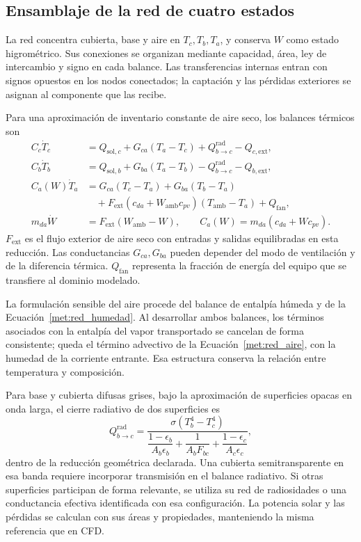 \subsection{Ensamblaje de la red de cuatro estados}
\label{met:red}

La red concentra cubierta, base y aire en $T_c,T_b,T_a$, y conserva $W$ como estado higrométrico. Sus conexiones se organizan mediante capacidad, área, ley de intercambio y signo en cada balance. Las transferencias internas entran con signos opuestos en los nodos conectados; la captación y las pérdidas exteriores se asignan al componente que las recibe.

Para una aproximación de inventario constante de aire seco, los balances térmicos son
\begin{align}
C_c\dot T_c&=Q_{\mathrm{sol},c}+G_{ca}(T_a-T_c)+Q_{b\to c}^{\mathrm{rad}}-Q_{c,\mathrm{ext}},
\label{met:red_cubierta}\\
C_b\dot T_b&=Q_{\mathrm{sol},b}+G_{ba}(T_a-T_b)-Q_{b\to c}^{\mathrm{rad}}-Q_{b,\mathrm{ext}},
\label{met:red_base}\\
C_a(W)\dot T_a&=G_{ca}(T_c-T_a)+G_{ba}(T_b-T_a)
\nonumber\\[-1mm]
&\quad+F_{\mathrm{ext}}(c_{da}+W_{\mathrm{amb}}c_{pv})(T_{\mathrm{amb}}-T_a)+Q_{\mathrm{fan}},
\label{met:red_aire}\\
m_{da}\dot W&=F_{\mathrm{ext}}(W_{\mathrm{amb}}-W),\qquad
C_a(W)=m_{da}(c_{da}+Wc_{pv}).
\label{met:red_humedad}
\end{align}
$F_{\mathrm{ext}}$ es el flujo exterior de aire seco con entradas y salidas equilibradas en esta reducción. Las conductancias $G_{ca},G_{ba}$ pueden depender del modo de ventilación y de la diferencia térmica. $Q_{\mathrm{fan}}$ representa la fracción de energía del equipo que se transfiere al dominio modelado.

La formulación sensible del aire procede del balance de entalpía húmeda y de la Ecuación~\ref{met:red_humedad}. Al desarrollar ambos balances, los términos asociados con la entalpía del vapor transportado se cancelan de forma consistente; queda el término advectivo de la Ecuación~\ref{met:red_aire}, con la humedad de la corriente entrante. Esa estructura conserva la relación entre temperatura y composición.

Para base y cubierta difusas grises, bajo la aproximación de superficies opacas en onda larga, el cierre radiativo de dos superficies es
\begin{equation}
Q_{b\to c}^{\mathrm{rad}}=
\frac{\sigma(T_b^4-T_c^4)}{
\dfrac{1-\epsilon_b}{A_b\epsilon_b}
+\dfrac{1}{A_bF_{bc}}
+\dfrac{1-\epsilon_c}{A_c\epsilon_c}},
\label{met:red_radiacion}
\end{equation}
dentro de la reducción geométrica declarada. Una cubierta semitransparente en esa banda requiere incorporar transmisión en el balance radiativo. Si otras superficies participan de forma relevante, se utiliza su red de radiosidades o una conductancia efectiva identificada con esa configuración. La potencia solar y las pérdidas se calculan con sus áreas y propiedades, manteniendo la misma referencia que en CFD.

